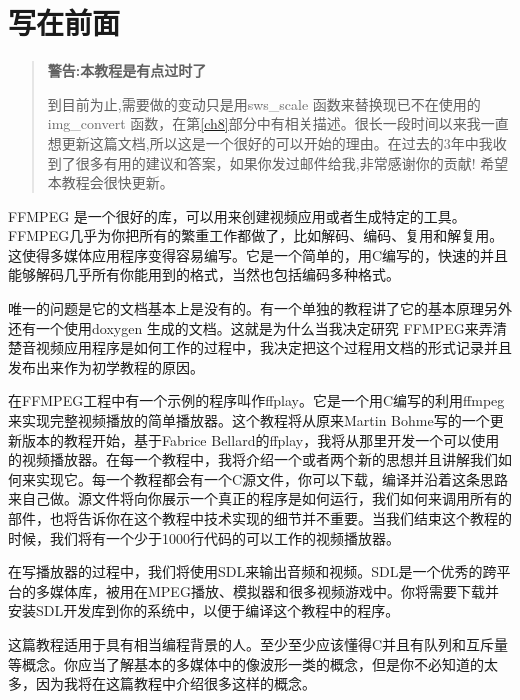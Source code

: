 ﻿\chapter*{写在前面}
\begin{quote}
\textbf{警告:本教程是有点过时了}

到目前为止,需要做的变动只是用sws_scale 函数来替换现已不在使用的 img_convert 函数，在第\ref{ch8}部分中有相关描述。很长一段时间以来我一直想更新这篇文档,所以这是一个很好的可以开始的理由。在过去的3年中我收到了很多有用的建议和答案，如果你发过邮件给我,非常感谢你的贡献! 希望本教程会很快更新。
\end{quote}

FFMPEG 是一个很好的库，可以用来创建视频应用或者生成特定的工具。FFMPEG几乎为你把所有的繁重工作都做了，比如解码、编码、复用和解复用。这使得多媒体应用程序变得容易编写。它是一个简单的，用C编写的，快速的并且能够解码几乎所有你能用到的格式，当然也包括编码多种格式。

唯一的问题是它的文档基本上是没有的。有一个单独的教程讲了它的基本原理另外还有一个使用doxygen 生成的文档。这就是为什么当我决定研究 FFMPEG来弄清楚音视频应用程序是如何工作的过程中，我决定把这个过程用文档的形式记录并且发布出来作为初学教程的原因。

在FFMPEG工程中有一个示例的程序叫作ffplay。它是一个用C编写的利用ffmpeg来实现完整视频播放的简单播放器。这个教程将从原来Martin Bohme写的一个更新版本的教程开始，基于Fabrice Bellard的ffplay，我将从那里开发一个可以使用的视频播放器。在每一个教程中，我将介绍一个或者两个新的思想并且讲解我们如何来实现它。每一个教程都会有一个C源文件，你可以下载，编译并沿着这条思路来自己做。源文件将向你展示一个真正的程序是如何运行，我们如何来调用所有的部件，也将告诉你在这个教程中技术实现的细节并不重要。当我们结束这个教程的时候，我们将有一个少于1000行代码的可以工作的视频播放器。

在写播放器的过程中，我们将使用SDL来输出音频和视频。SDL是一个优秀的跨平台的多媒体库，被用在MPEG播放、模拟器和很多视频游戏中。你将需要下载并安装SDL开发库到你的系统中，以便于编译这个教程中的程序。

这篇教程适用于具有相当编程背景的人。至少至少应该懂得C并且有队列和互斥量等概念。你应当了解基本的多媒体中的像波形一类的概念，但是你不必知道的太多，因为我将在这篇教程中介绍很多这样的概念。
